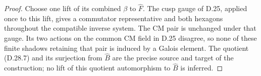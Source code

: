 \begin{proof}
Choose one lift of its combined $\beta$ to $\widehat F$.
The cusp gauge of D.25, applied once to this lift, gives
a commutator representative and both hexagons throughout
the compatible inverse system. The CM pair is unchanged
under that gauge. Its two actions on the common CM field
in D.25 disagree, so none of these finite shadows retaining
that pair is induced by a Galois element. The quotient
(D.28.7) and its surjection from $\widehat B$ are the
precise source and target of the construction; no lift
of this quotient automorphism to $\widehat B$ is inferred.
\end{proof}

